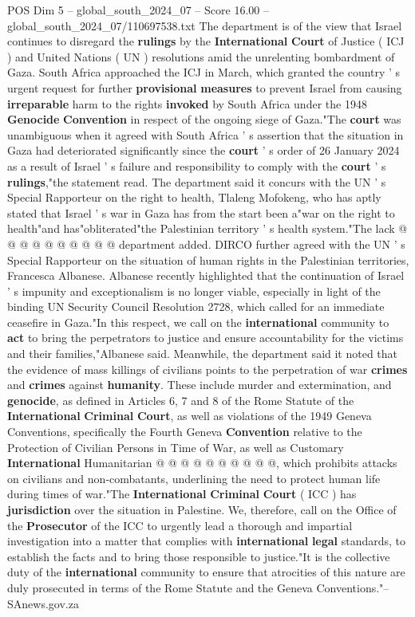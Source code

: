 \begin{textsample}{POS Dim 5 – global\_south\_2024\_07 – Score 16.00 – global\_south\_2024\_07/110697538.txt}  \label{ex:f5_pos_174}
The department is of the view that Israel continues to disregard the \textbf{rulings} by the \textbf{International} \textbf{Court} of Justice ( ICJ ) and United Nations ( UN ) resolutions amid the unrelenting bombardment of Gaza.
South Africa approached the ICJ in March, which granted the country ' s urgent request for further \textbf{provisional} \textbf{measures} to prevent Israel from causing \textbf{irreparable} harm to the rights \textbf{invoked} by South Africa under the 1948 \textbf{Genocide} \textbf{Convention} in respect of the ongoing siege of Gaza."The \textbf{court} was unambiguous when it agreed with South Africa ' s assertion that the situation in Gaza had deteriorated significantly since the \textbf{court} ' s order of 26 January 2024 as a result of Israel ' s failure and responsibility to comply with the \textbf{court} ' s \textbf{rulings},"the statement read.
The department said it concurs with the UN ' s Special Rapporteur on the right to health, Tlaleng Mofokeng, who has aptly stated that Israel ' s war in Gaza has from the start been a"war on the right to health"and has"obliterated"the Palestinian territory ' s health system."The lack @ @ @ @ @ @ @ @ @ @ department added.
DIRCO further agreed with the UN ' s Special Rapporteur on the situation of human rights in the Palestinian territories, Francesca Albanese.
Albanese recently highlighted that the continuation of Israel ' s impunity and exceptionalism is no longer viable, especially in light of the binding UN Security Council Resolution 2728, which called for an immediate ceasefire in Gaza."In this respect, we call on the \textbf{international} community to \textbf{act} to bring the perpetrators to justice and ensure accountability for the victims and their families,"Albanese said.
Meanwhile, the department said it noted that the evidence of mass killings of civilians points to the perpetration of war \textbf{crimes} and \textbf{crimes} against \textbf{humanity}.
These include murder and extermination, and \textbf{genocide}, as defined in Articles 6, 7 and 8 of the Rome Statute of the \textbf{International} \textbf{Criminal} \textbf{Court}, as well as violations of the 1949 Geneva Conventions, specifically the Fourth Geneva \textbf{Convention} relative to the Protection of Civilian Persons in Time of War, as well as Customary \textbf{International} Humanitarian @ @ @ @ @ @ @ @ @ @, which prohibits attacks on civilians and non-combatants, underlining the need to protect human life during times of war."The \textbf{International} \textbf{Criminal} \textbf{Court} ( ICC ) has \textbf{jurisdiction} over the situation in Palestine.
We, therefore, call on the Office of the \textbf{Prosecutor} of the ICC to urgently lead a thorough and impartial investigation into a matter that complies with \textbf{international} \textbf{legal} standards, to establish the facts and to bring those responsible to justice."It is the collective duty of the \textbf{international} community to ensure that atrocities of this nature are duly prosecuted in terms of the Rome Statute and the Geneva Conventions."-- SAnews.gov.za


\end{textsample}
